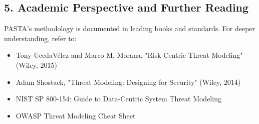 \subsection*{5. Academic Perspective and Further Reading}
PASTA’s methodology is documented in leading books and standards. For deeper understanding, refer to:
\begin{itemize}
	\item Tony UcedaVélez and Marco M. Morana, "Risk Centric Threat Modeling" (Wiley, 2015)
	\item Adam Shostack, "Threat Modeling: Designing for Security" (Wiley, 2014)
	\item NIST SP 800-154: Guide to Data-Centric System Threat Modeling
	\item OWASP Threat Modeling Cheat Sheet
\end{itemize}
